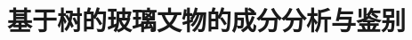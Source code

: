 \documentclass[UTF8,12pt]{ctexart}
\begin{document}



\title{基于树的玻璃文物的成分分析与鉴别}



\author{} %
\date{} %
\maketitle %
\vspace{-4em}  %







\thispagestyle{empty}  %
\newpage  %



\pagestyle{fancy}
\fancyhead{} %
\fancyfoot{} %
\begin{center} \tableofcontents \end{center}
\thispagestyle{empty}\newpage



\pagestyle{fancy}
\fancyhead[R]{} %
\fancyhead[C]{} %
\fancyhead[L]{} %
\fancyfoot[R]{} %
\fancyfoot[C]{- {\thepage}\ -} %
\fancyfoot[L]{} %
\setcounter{page}{1}  



\end{document}
